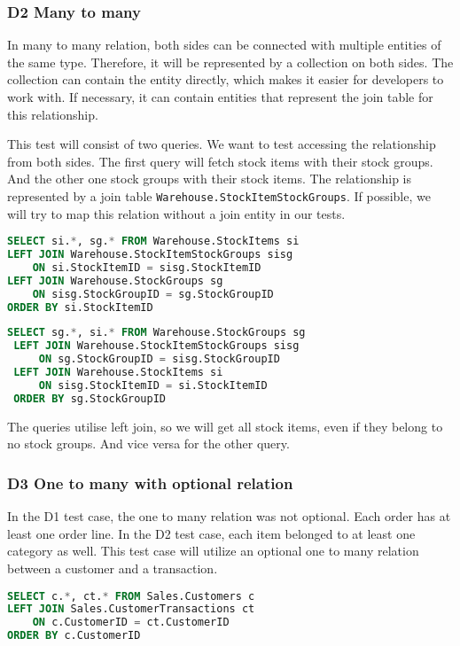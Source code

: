 \subsubsection*{D2 Many to many} \label{query:d2}
In many to many relation, both sides can be connected with multiple entities of the same type. Therefore, it will be represented by a collection on both sides. The collection can contain the entity directly, which makes it easier for developers to work with. If necessary, it can contain entities that represent the join table for this relationship.

This test will consist of two queries. We want to test accessing the relationship from both sides. The first query will fetch stock items with their stock groups. And the other one stock groups with their stock items.
The relationship is represented by a join table \texttt{Warehouse.StockItemStockGroups}. If possible, we will try to map this relation without a join entity in our tests.

\begin{lstlisting}[language=SQL]
SELECT si.*, sg.* FROM Warehouse.StockItems si
LEFT JOIN Warehouse.StockItemStockGroups sisg
    ON si.StockItemID = sisg.StockItemID
LEFT JOIN Warehouse.StockGroups sg
    ON sisg.StockGroupID = sg.StockGroupID
ORDER BY si.StockItemID
\end{lstlisting}
\begin{lstlisting}[language=SQL]
 SELECT sg.*, si.* FROM Warehouse.StockGroups sg
 LEFT JOIN Warehouse.StockItemStockGroups sisg
     ON sg.StockGroupID = sisg.StockGroupID
 LEFT JOIN Warehouse.StockItems si
     ON sisg.StockItemID = si.StockItemID
 ORDER BY sg.StockGroupID
\end{lstlisting}
The queries utilise left join, so we will get all stock items, even if they belong to no stock groups. And vice versa for the other query.

\subsubsection*{D3 One to many with optional relation} \label{query:d3}
In the D1 test case, the one to many relation was not optional. Each order has at least one order line. In the D2 test case, each item belonged to at least one category as well.
This test case will utilize an optional one to many relation between a customer and a transaction. 

\begin{lstlisting}[language=SQL]
SELECT c.*, ct.* FROM Sales.Customers c
LEFT JOIN Sales.CustomerTransactions ct
    ON c.CustomerID = ct.CustomerID
ORDER BY c.CustomerID
\end{lstlisting}

